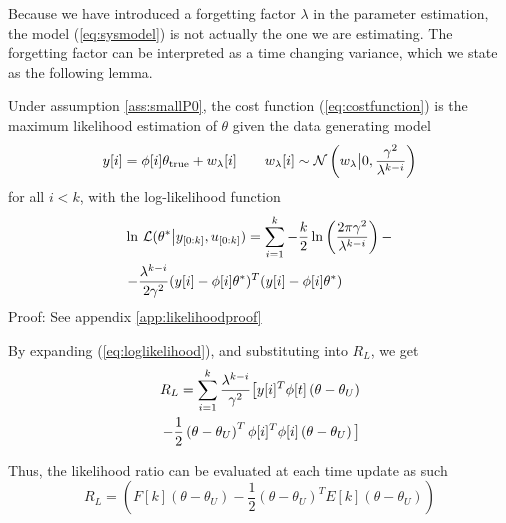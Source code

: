 Because we have introduced a forgetting factor $\lambda$
in the parameter estimation, the model (\ref{eq:sysmodel})
is not actually the one we are estimating. The forgetting factor can be
interpreted as a time changing variance, which we state as the following lemma.
\begin{lemma}
    \label{lem:tvsysmodel}
    Under assumption \ref{ass:smallP0}, the cost function (\ref{eq:costfunction})
    is the maximum likelihood estimation of $\theta$ given the data generating model
    \begin{equation}
        y[i] = \phi[i]\theta_{\text{true}} + w_\lambda[i] \qquad w_\lambda[i]
        \sim \mathcal{N}\left(w_\lambda\big{\vert} 0, \frac{\gamma^2}{\lambda^{k-i}}\right)
        \label{eq:tvsysmodel}
    \end{equation}
    for all $i<k$, with the log-likelihood function
    \begin{equation}
        \begin{aligned}
            \ln&~\mathcal{L}(\theta^*\big{|} y_{[0:k]}, u_{[0:k]}) = \sum\limits_{i=1}^{k}
            -\frac{k}{2}\ln\left(\frac{2\pi\gamma^2}{\lambda^{k-i}}\right) -
            \\-&
            \frac{\lambda^{k-i}}{2\gamma^2}(y[i]-\phi[i]\theta^*)^T(y[i]-\phi[i]\theta^*)
        \end{aligned}
        \label{eq:loglikelihood}
        \end{equation}
    Proof: See appendix \ref{app:likelihoodproof}
\end{lemma}
By expanding (\ref{eq:loglikelihood}), and substituting into $R_L$, we get
\begin{equation}
    \begin{aligned}
        R_L = \sum\limits_{i=1}^{k}\frac{\lambda^{k-i}}{\gamma^2} \big{[}
        y[i]^T\phi[t]\left(\theta - \theta_U\right)\\
        -\frac{1}{2}\left(\theta - \theta_U\right)^T
        \phi[i]^T\phi[i]\left(\theta - \theta_U\right)\big{]}
    \end{aligned}
\end{equation}

Thus, the likelihood ratio can be evaluated at each time update as such
\begin{equation}
    R_L = \left( F[k]\left(\theta - \theta_U\right) - 
    \frac{1}{2}\left(\theta - \theta_U\right)^TE[k]\left(\theta - \theta_U\right)  \right)
    \label{eq:likelihoodratio}
\end{equation}

